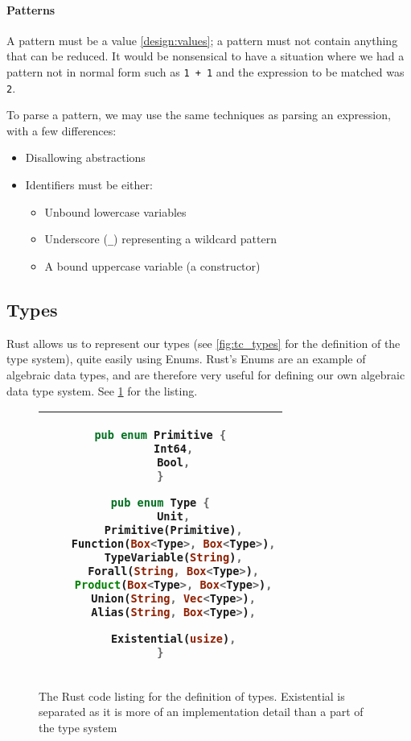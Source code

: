 \paragraph{Patterns}
\label{impl:parsing_patterns}
A pattern must be a value \ref{design:values}; a pattern must not contain anything that can be reduced. It would be nonsensical to have a situation where we had a pattern not in normal form such as \verb|1 + 1| and the expression to be matched was \verb|2|. 

To parse a pattern, we may use the same techniques as parsing an expression, with a few differences:
\begin{itemize}
    \item Disallowing abstractions
    \item Identifiers must be either:
    \begin{itemize}
        \item Unbound lowercase variables
        \item Underscore (\verb|_|) representing a wildcard pattern
        \item A bound uppercase variable (a constructor)
    \end{itemize}
\end{itemize}

\subsection{Types}

Rust allows us to represent our types (see \ref{fig:tc_types} for the definition of the type system), quite easily using Enums. Rust's Enums are an example of algebraic data types, and are therefore very useful for defining our own algebraic data type system. See \ref{fig:type_lst} for the listing. 

\begin{figure}[ht]
    \centering
    \begin{tabular}{|c|}
    \hline
    \begin{lstlisting}[language=Rust]
pub enum Primitive {
    Int64,
    Bool,
}

pub enum Type {
    Unit,
    Primitive(Primitive),
    Function(Box<Type>, Box<Type>),
    TypeVariable(String),
    Forall(String, Box<Type>),
    Product(Box<Type>, Box<Type>),
    Union(String, Vec<Type>),
    Alias(String, Box<Type>),

    Existential(usize),
}
    \end{lstlisting}
    \\\hline
    \end{tabular}
    \caption{The Rust code listing for the definition of types. Existential is separated as it is more of an implementation detail than a part of the type system}
    \label{fig:type_lst}
\end{figure}

